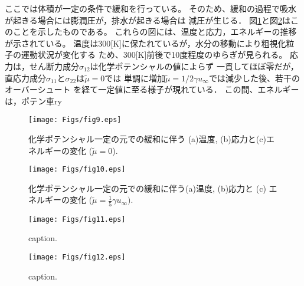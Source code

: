 ここでは体積が一定の条件で緩和を行っている。
そのため、緩和の過程で吸水が起きる場合には膨潤圧が，排水が起きる場合は
減圧が生じる．
図\ref{fig:fig9}と図\ref{fig:fig10}はこのことを示したものである。
これらの図には、温度と応力，エネルギーの推移が示されている。
温度は300[K]に保たれているが，水分の移動により粗視化粒子の運動状況が変化する
ため、300[K]前後で10度程度のゆらぎが見られる。
応力は，せん断力成分$\sigma_{12}$は化学ポテンシャルの値によらず
一貫してほぼ零だが，直応力成分$\sigma_{11}$と$\sigma_{22}$は$\tilde \mu=0$では
単調に増加$\tilde \mu =1/2\gamma u_\infty$では減少した後、若干のオーバーシュート
を経て一定値に至る様子が現れている．
この間、エネルギーは，ポテン車ry
\begin{figure}[h]
	\begin{center}
	\texttt{[image: Figs/fig9.eps]} 
	\end{center}
	\caption{
		化学ポテンシャル一定の元での緩和に伴う
		(a)温度, (b)応力と(c)エネルギーの変化 ($\tilde \mu=0$).
	} 
	\label{fig:fig9}
\end{figure}
\begin{figure}[h]
	\begin{center}
	\texttt{[image: Figs/fig10.eps]} 
	\end{center}
	\caption{
		化学ポテンシャル一定の元での緩和に伴う(a)温度, (b)応力と (c) エネルギーの変化
		($\tilde \mu =\frac{1}{5}\gamma u_\infty).$
	} 
	\label{fig:fig10}
\end{figure}
\begin{figure}[h]
	\begin{center}
	\texttt{[image: Figs/fig11.eps]} 
	\end{center}
	\caption{
		caption.
	} 
	\label{fig:fig11}
\end{figure}
\begin{figure}[h]
	\begin{center}
	\texttt{[image: Figs/fig12.eps]} 
	\end{center}
	\caption{
		caption.
	} 
	\label{fig:fig12}
\end{figure}

